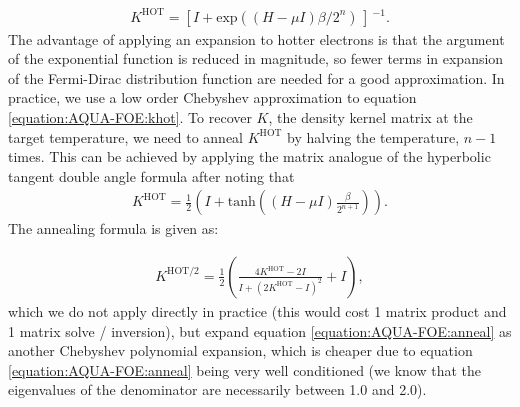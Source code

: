 \documentclass[letterpaper,10pt,english]{sphinxmanual}
\begin{document}
\label{\detokenize{AQUA-FOE:equation-khot}}\begin{equation}\label{equation:AQUA-FOE:khot}
\begin{split}K^\mathrm{HOT}=[I+\mathrm{exp}((H-\mu I)\beta/2^{n})\, ] \,^{-1}.\end{split}
\end{equation}
The advantage of applying an expansion to hotter electrons is that the
argument of the exponential function is reduced in magnitude, so fewer
terms in expansion of the Fermi-Dirac distribution function are needed
for a good approximation. In practice, we use a low order Chebyshev
approximation to equation \eqref{equation:AQUA-FOE:khot}. To recover \(K\), the density
kernel matrix at the target temperature, we need to anneal
\(K^\mathrm{HOT}\) by halving the temperature, \(n-1\) times.
This can be achieved by applying the matrix analogue of the hyperbolic
tangent double angle formula after noting that
\begin{equation*}
\begin{split}K^\mathrm{HOT}=\frac{1}{2}\left (I+\mathrm{tanh}\left((H-\mu I) \frac{\beta}{2^{n+1}}\right) \right ).\end{split}
\end{equation*}
The annealing formula is given as:

\label{\detokenize{AQUA-FOE:equation-anneal}}\begin{equation}\label{equation:AQUA-FOE:anneal}
\begin{split}K^\mathrm{HOT/2}=\frac{1}{2}\left( \frac{4K^\mathrm{HOT}-2I}{I + (2K^{\mathrm{HOT}}-I)^2}+I \right),\end{split}
\end{equation}
which we do not apply directly in practice (this would cost 1 matrix
product and 1 matrix solve / inversion), but expand equation
\eqref{equation:AQUA-FOE:anneal} as another Chebyshev polynomial expansion, which is cheaper
due to equation \eqref{equation:AQUA-FOE:anneal} being very well conditioned (we know that
the eigenvalues of the denominator are necessarily between 1.0 and 2.0).
\end{document}
